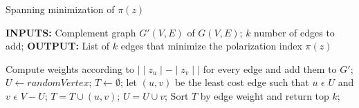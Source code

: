 \begin{algorithm}[htbp]
	\caption{Spanning minimization of $\pi(z)$}
	\label{alg:spanning}
	\begin{flushleft}
        		\textbf{INPUTS:} Complement graph $G'(V, E)$ of $G(V, E)$; $k$ number of edges to add;
		\vspace{6pt}
        		\textbf{OUTPUT:} List of $k$ edges that minimize the polarization index $\pi(z)$
	\end{flushleft}
	\begin{algorithmic}[1]
		\STATE Compute weights according to $\mid \mid{z_u}\mid - \mid{z_v}\mid\mid$ for every edge and add them to $G'$;
		\STATE $U \leftarrow randomVertex$;
		\STATE $T \leftarrow \emptyset$;
			\STATE let $(u, v)$ be the least cost edge such that $u$ $\epsilon$ $U$ and $v$ $\epsilon$ $V - U$;
			\STATE $T = T \cup {(u, v)}$;
			\STATE $U = U \cup {v}$;
		\ENDWHILE
		\STATE Sort $T$ by edge weight and return top $k$;
	\end{algorithmic}
\end{algorithm}

